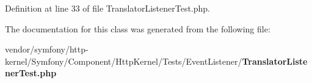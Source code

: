 Definition at line 33 of file Translator\+Listener\+Test.\+php.



The documentation for this class was generated from the following file\+:\begin{DoxyCompactItemize}
\item 
vendor/symfony/http-\/kernel/\+Symfony/\+Component/\+Http\+Kernel/\+Tests/\+Event\+Listener/{\bf Translator\+Listener\+Test.\+php}\end{DoxyCompactItemize}
